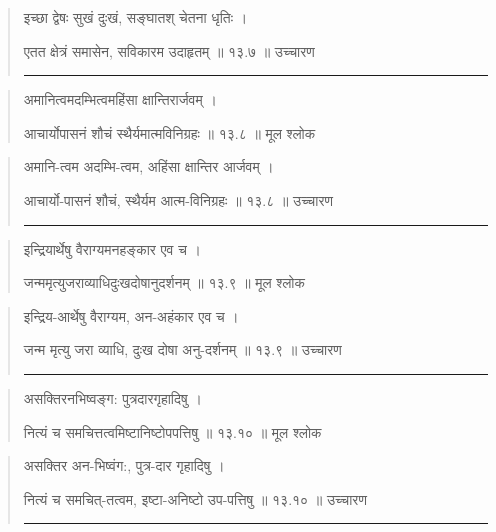 \begin{quotation}

इच्छा द्वेषः सुखं दुःखं, सङ्‍घातश् चेतना धृतिः  ।  

एतत क्षेत्रं समासेन, सविकारम उदाहृतम्‌  ॥ १३.७ ॥  उच्चारण

\noindent\rule{16cm}{0.4pt} 
\end{quotation}


\begin{quotation}

अमानित्वमदम्भित्वमहिंसा क्षान्तिरार्जवम्‌  ।  

आचार्योपासनं शौचं स्थैर्यमात्मविनिग्रहः  ॥ १३.८ ॥  मूल श्लोक
\end{quotation}

\begin{quotation}

अमानि-त्वम अदम्भि-त्वम, अहिंसा क्षान्तिर आर्जवम्‌  ।  

आचार्यो-पासनं शौचं, स्थैर्यम आत्म-विनिग्रहः  ॥ १३.८ ॥  उच्चारण

\noindent\rule{16cm}{0.4pt} 
\end{quotation}


\begin{quotation}

इन्द्रियार्थेषु वैराग्यमनहङ्‍कार एव च  ।  

जन्ममृत्युजराव्याधिदुःखदोषानुदर्शनम्‌  ॥ १३.९ ॥  मूल श्लोक
\end{quotation}

\begin{quotation}

इन्द्रिय-आर्थेषु वैराग्यम, अन-अहंकार एव च  ।  

जन्म मृत्यु जरा व्याधि, दुःख दोषा अनु-दर्शनम्‌  ॥ १३.९ ॥  उच्चारण

\noindent\rule{16cm}{0.4pt} 
\end{quotation}


\begin{quotation}

असक्तिरनभिष्वङ्‍ग: पुत्रदारगृहादिषु  ।  

नित्यं च समचित्तत्वमिष्टानिष्टोपपत्तिषु  ॥ १३.१० ॥  मूल श्लोक
\end{quotation}

\begin{quotation}

असक्तिर अन-भिष्वंग:, पुत्र-दार गृहादिषु  ।  

नित्यं च समचित्-तत्वम,  इष्टा-अनिष्टो उप-पत्तिषु  ॥ १३.१० ॥  उच्चारण

\noindent\rule{16cm}{0.4pt} 
\end{quotation}


